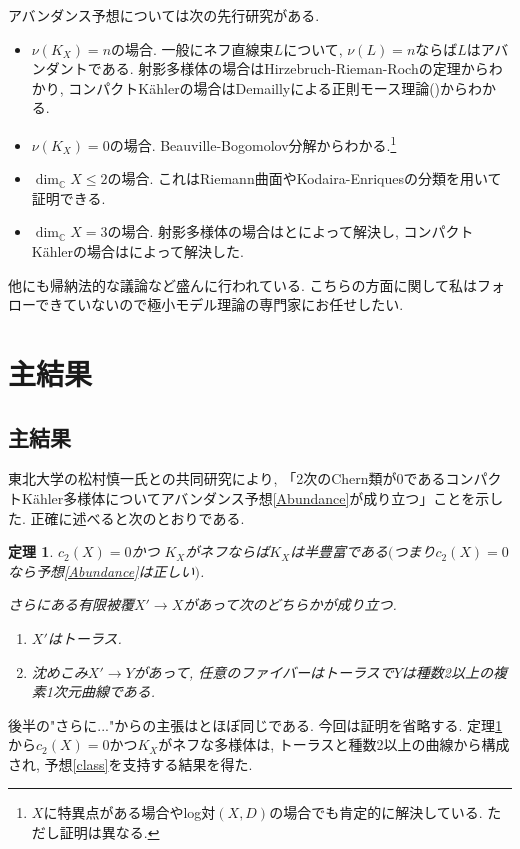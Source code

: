 \documentclass[12pt]{amsart}
\newtheorem{thm}{定理}[section]
\theoremstyle{definition}
\theoremstyle{remark}
\newcommand{\C}{\mathbb{C}}
\begin{document}
アバンダンス予想については次の先行研究がある.
\begin{itemize}
\item $\nu(K_X)=n$の場合. %
一般にネフ直線束$L$について, $\nu(L)=n$ならば$L$はアバンダントである. 射影多様体の場合はHirzebruch-Rieman-Rochの定理からわかり, コンパクトK\"ahlerの場合はDemaillyによる正則モース理論(\cite{Dem})からわかる.
\item $\nu(K_X)=0$の場合. Beauville-Bogomolov分解からわかる.\footnote{$X$に特異点がある場合やlog対$(X,D)$の場合でも肯定的に解決している. ただし証明は異なる.}
\item $\dim_{\C} X \le 2$の場合. これはRiemann曲面やKodaira-Enriquesの分類を用いて証明できる.
\item $\dim_{\C} X = 3$の場合. 射影多様体の場合は\cite{Miya87}と\cite{Kaw92}によって解決し, コンパクトK\"ahlerの場合は\cite{CHP13}によって解決した.
\end{itemize}
他にも帰納法的な議論など盛んに行われている. 
こちらの方面に関して私はフォローできていないので極小モデル理論の専門家にお任せしたい.


\section{主結果}
\label{main}

\subsection{主結果}

東北大学の松村慎一氏との共同研究により, 「2次のChern類が$0$であるコンパクトK\"ahler多様体についてアバンダンス予想\ref{Abundance}が成り立つ」ことを示した.
正確に述べると次のとおりである. 

\begin{thm}\cite{IM22}
\label{main_result}
$c_2(X)=0$かつ%
$K_X$がネフならば$K_X$は半豊富である$($つまり$c_2(X)=0$なら予想\ref{Abundance}は正しい$)$.

さらにある有限被覆$X' \rightarrow X$があって次のどちらかが成り立つ.
\begin{enumerate}
\renewcommand{\labelenumi}{$(\arabic{enumi})$.}
 \setlength{\parskip}{0cm} %
  \setlength{\itemsep}{0cm}
\item $X'$はトーラス.
\item 沈めこみ$X' \rightarrow Y$があって, 任意のファイバーはトーラスで$Y$は種数2以上の複素1次元曲線である.
\end{enumerate}
\end{thm}
後半の"さらに..."からの主張は\cite{Hor13}とほぼ同じである. 今回は証明を省略する. 定理\ref{main_result}から$c_2(X)=0$かつ$K_X$がネフな多様体は, トーラスと種数2以上の曲線から構成され, 予想\ref{class}を支持する結果を得た.
\end{document}
